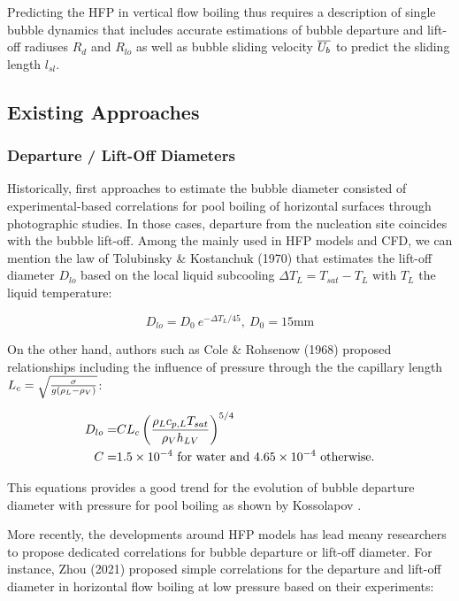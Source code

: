 \npar 

Predicting the HFP in vertical flow boiling thus requires a description of single bubble dynamics that includes accurate estimations of bubble departure and lift-off radiuses $R_{d}$ and $R_{lo}$ as well as bubble sliding velocity $\overline{U_{b}}$ to predict the sliding length $l_{sl}$.

\subsection{Existing Approaches}

\subsubsection{Departure / Lift-Off Diameters}

Historically, first approaches to estimate the bubble diameter consisted of experimental-based correlations for pool boiling of horizontal surfaces through photographic studies. In those cases, departure from the nucleation site coincides with the bubble lift-off. Among the mainly used in HFP models and CFD, we can mention the law of Tolubinsky \& Kostanchuk (1970)\cite{tolubinsky_vapour_1970} that estimates the lift-off diameter $D_{lo}$ based on the local liquid subcooling $\Delta T_{L} = T_{sat} - T_{L}$ with $T_{L}$ the liquid temperature:

\begin{equation}
D_{lo} = D_{0}~e^{-\Delta T_{L}/{45}},\ D_{0}=15\mathrm{mm}
\label{eq:dlo_tolubinsky}
\end{equation}

\npar
On the other hand, authors such as Cole \& Rohsenow (1968) \cite{cole_rohsenow} proposed relationships including the influence of pressure through the the capillary length $L_{c}=\sqrt{\frac{\sigma}{g\left( \rho_{L}-\rho_{V} \right)}}$:

\begin{align}
D_{lo} =& C L_{c} \left( \frac{\rho_{L}c_{p,L}T_{sat}}{\rho_{V}h_{LV}} \right)^{5/4}
\label{eq:dlo_cole_rohsenow}
\\
\nonumber C=&1.5\times 10^{-4}\ \text{for water and }4.65\times 10^{-4}\ \text{otherwise}.
\end{align}

This equations provides a good trend for the evolution of bubble departure diameter with pressure for pool boiling as shown by Kossolapov \cite{kossolapov_experimental_2021}.


\npar
More recently, the developments around HFP models has lead meany researchers to propose dedicated correlations for bubble departure or lift-off diameter. For instance, Zhou \etal (2021) \cite{zhou_mechanistic_2021} proposed simple correlations for the departure and lift-off diameter in horizontal flow boiling at low pressure based on their experiments:

